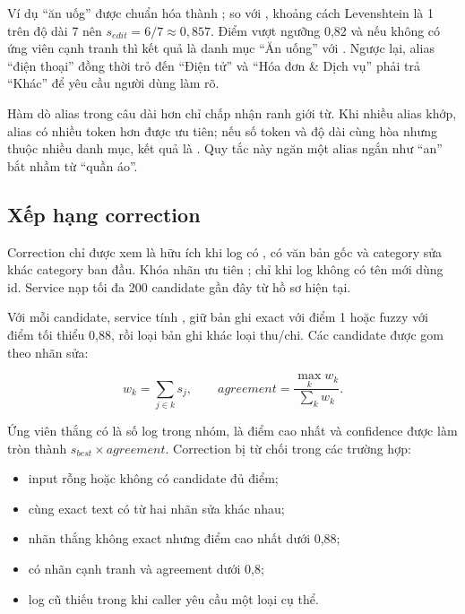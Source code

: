 Ví dụ ``ăn uốg'' được chuẩn hóa thành ; so với , khoảng cách Levenshtein là 1 trên độ dài 7 nên $s_{edit}=6/7\approx0{,}857$. Điểm vượt ngưỡng 0,82 và nếu không có ứng viên cạnh tranh thì kết quả là danh mục ``Ăn uống'' với . Ngược lại, alias ``điện thoại'' đồng thời trỏ đến ``Điện tử'' và ``Hóa đơn \& Dịch vụ'' phải trả ``Khác'' để yêu cầu người dùng làm rõ.

Hàm dò alias trong câu dài hơn chỉ chấp nhận ranh giới từ. Khi nhiều alias khớp, alias có nhiều token hơn được ưu tiên; nếu số token và độ dài cùng hòa nhưng thuộc nhiều danh mục, kết quả là . Quy tắc này ngăn một alias ngắn như ``an'' bắt nhầm từ ``quần áo''.

\subsection{Xếp hạng correction}

Correction chỉ được xem là hữu ích khi log có , có văn bản gốc và category sửa khác category ban đầu. Khóa nhãn ưu tiên ; chỉ khi log không có tên mới dùng id. Service nạp tối đa 200 candidate gần đây từ hồ sơ hiện tại.

Với mỗi candidate, service tính , giữ bản ghi exact với điểm 1 hoặc fuzzy với điểm tối thiểu 0,88, rồi loại bản ghi khác loại thu/chi. Các candidate được gom theo nhãn sửa:

\begin{equation}
  w_k=\sum_{j\in k}s_j,\qquad
  agreement=\frac{\max_k w_k}{\sum_k w_k}.
\end{equation}

Ứng viên thắng có  là số log trong nhóm,  là điểm cao nhất và confidence được làm tròn thành $s_{best}\times agreement$. Correction bị từ chối trong các trường hợp:

\begin{itemize}
  \item input rỗng hoặc không có candidate đủ điểm;
  \item cùng exact text có từ hai nhãn sửa khác nhau;
  \item nhãn thắng không exact nhưng điểm cao nhất dưới 0,88;
  \item có nhãn cạnh tranh và agreement dưới 0,8;
  \item log cũ thiếu  trong khi caller yêu cầu một loại cụ thể.
\end{itemize}

